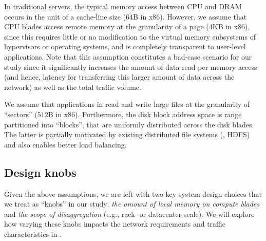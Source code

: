 
 
In traditional servers, the typical memory access between CPU and DRAM occurs in the unit of a cache-line size (64B in x86). However, we assume that CPU blades access remote memory at the granularity of a page (4KB in x86), since this requires little or no modification to the virtual memory subsystems of hypervisors or operating systems, and is completely transparent to user-level applications. Note that this assumption constitutes a bad-case scenario for our study since it significantly increases the amount of data read per memory access (and hence, latency for transferring this larger amount of data across the network) as well as the total traffic volume.


We assume that applications in \dis read and write large files at the granularity of ``sectors'' ($512$B in x86). Furthermore, the disk block address space is range partitioned into ``blocks'', that are uniformly distributed across the disk blades. The latter is partially motivated by existing distributed file systems (\eg, HDFS) and also enables better load balancing. %

\vspace{-0.1in}
\subsection{Design knobs}
\label{ssec:knobs}
\vspace{-0.05in}
Given the above assumptions, we are left with two key system design choices that we treat as ``knobs'' in our study: {\em the amount of local memory on compute blades} and  {\em the scope of disaggregation} (e.g., rack- or datacenter-scale). We will explore how varying these knobs impacts the network requirements and traffic characteristics in \dis. 

